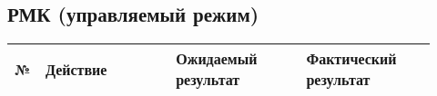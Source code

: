 \subsection{РМК (управляемый режим)}
\renewcommand{\arraystretch}{1.8} %
\begin{longtable}{|p{0.02\linewidth}|p{0.3\linewidth}|p{0.3\linewidth}|p{0.3\linewidth}|}
    \hline
   № & \textbf{Действие} & \textbf{Ожидаемый результат} & \textbf{Фактический результат} \\
    \hline
   \hline
   \endhead
%
%

\end{longtable}

